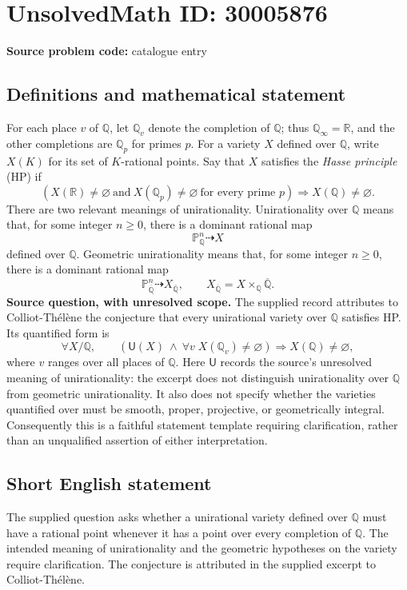 \documentclass[11pt]{article}
\newcommand{\Q}{\mathbb{Q}}
\newcommand{\R}{\mathbb{R}}
\newcommand{\PP}{\mathbb{P}}
\begin{document}
\section*{UnsolvedMath ID: 30005876}
\textbf{Source problem code:} catalogue entry
\subsection{Definitions and mathematical statement}
For each place \(v\) of \(\Q\), let \(\Q_v\) denote the completion of \(\Q\); thus \(\Q_\infty=\R\), and the other completions are \(\Q_p\) for primes \(p\). For a variety \(X\) defined over \(\Q\), write \(X(K)\) for its set of \(K\)-rational points. Say that \(X\) satisfies the \emph{Hasse principle} (HP) if
\[
\left(X(\R)\ne\varnothing\ \text{and}\ X(\Q_p)\ne\varnothing\ \text{for every prime }p\right)
\Longrightarrow X(\Q)\ne\varnothing.
\]
There are two relevant meanings of unirationality. Unirationality over \(\Q\) means that, for some integer \(n\geq 0\), there is a dominant rational map
\[
\PP^n_{\Q}\dashrightarrow X
\]
defined over \(\Q\). Geometric unirationality means that, for some integer \(n\geq 0\), there is a dominant rational map
\[
\PP^n_{\overline{\Q}}\dashrightarrow X_{\overline{\Q}},
\qquad X_{\overline{\Q}}=X\times_{\Q}\overline{\Q}.
\]
\textbf{Source question, with unresolved scope.} The supplied record attributes to Colliot-Th\'el\`ene the conjecture that every unirational variety over \(\Q\) satisfies HP. Its quantified form is
\[
\forall X/\Q,\qquad
\left(\mathsf U(X)\ \land\ \forall v\;X(\Q_v)\ne\varnothing\right)
\Longrightarrow X(\Q)\ne\varnothing,
\]
where \(v\) ranges over all places of \(\Q\). Here \(\mathsf U\) records the source's unresolved meaning of unirationality: the excerpt does not distinguish unirationality over \(\Q\) from geometric unirationality. It also does not specify whether the varieties quantified over must be smooth, proper, projective, or geometrically integral. Consequently this is a faithful statement template requiring clarification, rather than an unqualified assertion of either interpretation.
\subsection{Short English statement}
The supplied question asks whether a unirational variety defined over \(\Q\) must have a rational point whenever it has a point over every completion of \(\Q\). The intended meaning of unirationality and the geometric hypotheses on the variety require clarification. The conjecture is attributed in the supplied excerpt to Colliot-Th\'el\`ene.
\end{document}
